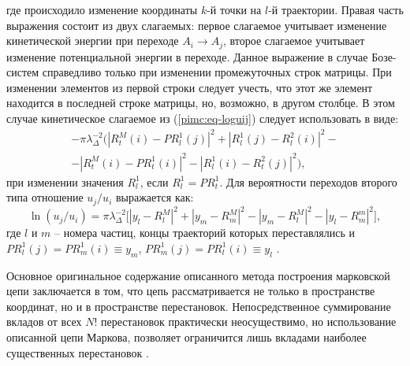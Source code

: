 где происходило изменение координаты $k$-й точки на $l$-й траектории. Правая часть выражения состоит из двух слагаемых: первое слагаемое учитывает изменение кинетической энергии при переходе $A_i \longrightarrow A_j$, второе слагаемое учитывает изменение потенциальной энергии в переходе.
Данное выражение в случае Бозе-систем справедливо только при изменении промежуточных строк матрицы. При изменении элементов из первой строки следует учесть, что этот же элемент находится в последней строке матрицы, но, возможно, в другом столбце. В этом случае кинетическое слагаемое из (\ref{pimc:eq-loguij}) следует использовать в виде:
\begin{multline*}
	-\pi \lambda_\Delta^{-2} ( |R_t^{M}(i) - PR_l^1(j)|^2 + | R^1_l(j) - R_l^{2}(i) |^2 - \\
			- | R^{M}_t(i) - PR_t^1(i) |^2 - | R^1_l(i) - R_t^{2}(j) |^2 ),
\end{multline*}
при изменении значения $R_l^1$, если $R_l^1 = PR_t^1$.
Для вероятности переходов второго типа отношение $u_j/u_i$ выражается как:
\begin{equation}
	\label{pimc:eq-exchange-prob}
	\ln (u_j/u_i) = \pi \lambda_\Delta^{-2} \Big[ |y_l - R_l^M|^2 + |y_m - R^M_m|^2 - |y_m - R_l^M|^2 
	- |y_l - R^m_m|^2  \Big],
\end{equation}
где $l$ и $m$ -- номера частиц, концы траекторий которых переставлялись и $PR_l^1(j)=PR_m^1(i) \equiv y_m$, $PR_m^1(j)=PR_l^1(i) \equiv y_l$ \cite{zamalin1973}.

Основное оригинальное содержание описанного метода построения марковской цепи заключается в том, что цепь рассматривается не только в пространстве координат, но и в пространстве перестановок. Непосредственное суммирование вкладов от всех $N!$ перестановок практически неосуществимо, но использование описанной цепи Маркова, позволяет ограничится лишь вкладами наиболее существенных перестановок \cite{Zamalin77}.

